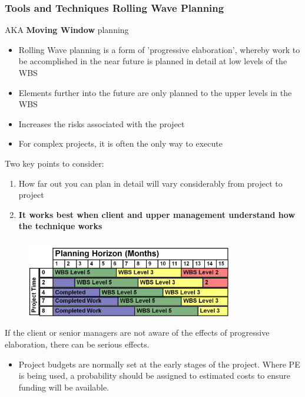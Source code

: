 \begin{frame}
\frametitle{Tools and Techniques \hfill Rolling Wave Planning}
AKA \textbf{Moving Window} planning
\begin{itemize}
	\item Rolling Wave planning is a form of 'progressive elaboration', whereby work to be accomplished in the near future is planned in detail at low levels of the WBS
	\item Elements further into the future are only planned to the upper levels in the WBS 
	\item Increases the risks associated with the project
	\item For complex projects, it is often the only way to execute
\end{itemize}

Two key points to consider:
\begin{enumerate}
	\item How far out you can plan in detail will vary considerably from project to project
	\item \textbf{It works best when client and upper management understand how the technique works} 
\end{enumerate}
\end{frame}




\begin{frame}
\frametitle{}
\begin{figure}
	\centering
		\includegraphics[width = 9cm]{images/movingwindow.jpg}
	\label{fig:movingwindow}
\end{figure}
If the client or senior managers are not aware of the effects of progressive elaboration, there can be serious effects.
\begin{itemize}
	\item Project budgets are normally set at the early stages of the project.  Where PE is being used, a probability should be assigned to estimated costs to ensure funding will be available.
\end{itemize}
 
\end{frame}




